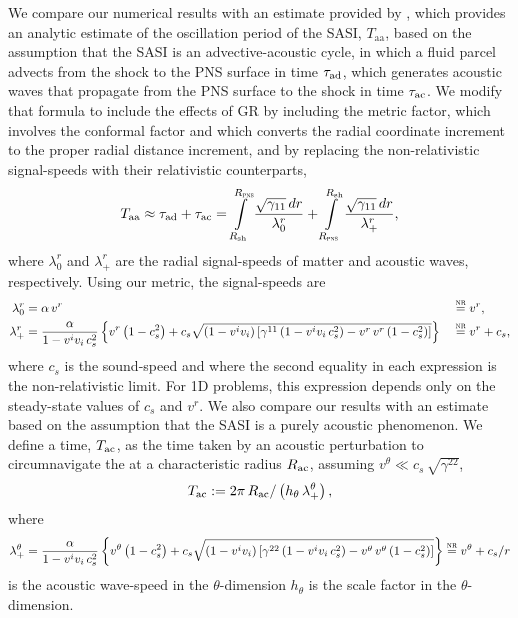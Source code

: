 We compare our numerical results with an estimate provided by
\citet{m2020}, which
provides an analytic estimate of the oscillation period
of the SASI, $T_{\mathrm{aa}}$,
based on the assumption that the SASI is an advective-acoustic cycle,
in which a fluid parcel advects from the shock to the PNS surface in time
$\tau_{\mathrm{ad}}$, which generates acoustic waves that propagate from the
PNS surface to the shock in time $\tau_{\mathrm{ac}}$.
We modify that formula to include the effects of GR
by including the metric factor, which involves the conformal factor
and which converts the radial coordinate increment to the proper radial
distance increment,
and by replacing the non-relativistic signal-speeds with their relativistic
counterparts,
\begin{equation}
  T_{\mathrm{aa}}\approx\tau_{\mathrm{ad}}+\tau_{\mathrm{ac}}
  =\int\limits_{R_{\mathrm{sh}}}^{R_{\textsc{pns}}}\frac{\sqrt{\gamma_{11}}\,dr}{\lambda^{r}_{0}}
  +\int\limits_{R_{\textsc{pns}}}^{R_{\mathrm{sh}}}\frac{\sqrt{\gamma_{11}}\,dr}{\lambda^{r}_{+}},
  \label{eq.MullerEst}
\end{equation}
where $\lambda^{r}_{0}$ and $\lambda^{r}_{+}$ are the radial signal-speeds of
matter and acoustic waves, respectively.
Using our metric, the signal-speeds are \citep{rz2013}
\begin{alignat}{2}
  \lambda^{r}_{0}&=\alpha\,v^{r}&&\stackrel{\textsc{nr}}{=}v^{r},\label{eq.lambda0}\\
  \lambda^{r}_{+}&=\frac{\alpha}{1-v^{i}v_{i}\,c_{s}^{2}}
  \left\{v^{r}\left(1-c_{s}^{2}\right)
  +c_{s}\sqrt{\left(1-v^{i}v_{i}\right)
  \left[\gamma^{11}\left(1-v^{i}v_{i}\,c_{s}^{2}\right)
  -v^{r}\,v^{r}\left(1-c_{s}^{2}\right)\right]}\right\}
  &&\stackrel{\textsc{nr}}{=}v^{r}+c_{s},\label{eq.lambda+}
\end{alignat}
where $c_{s}$ is the sound-speed
and where the second equality in each expression is the non-relativistic limit.
For 1D problems,
this expression depends only on the steady-state values of $c_{s}$ and $v^{r}$.
We also compare our results with an estimate based on the assumption that
the SASI is a purely acoustic phenomenon.
We define a time, $T_{\mathrm{ac}}$, as the time taken by an
acoustic perturbation
to circumnavigate the 
at a characteristic radius $R_{\mathrm{ac}}$,
assuming $v^{\theta}\ll c_{s}\,\sqrt{\gamma^{22}}$,
\begin{equation}
  T_{\mathrm{ac}}
  :=2\pi\,R_{\mathrm{ac}}/\left(h_{\theta}\,\lambda_{+}^{\theta}\right),
  \label{eq.Tac}
\end{equation}
where
\begin{equation}
  \lambda^{\theta}_{+}=\frac{\alpha}{1-v^{i}v_{i}\,c_{s}^{2}}
  \left\{v^{\theta}\left(1-c_{s}^{2}\right)
  +c_{s}\sqrt{\left(1-v^{i}v_{i}\right)
  \left[\gamma^{22}\left(1-v^{i}v_{i}\,c_{s}^{2}\right)
  -v^{\theta}\,v^{\theta}\left(1-c_{s}^{2}\right)\right]}\right\}
  \stackrel{\textsc{nr}}{=}v^{\theta}+c_{s}/r
\end{equation}
is the acoustic wave-speed in the $\theta$-dimension \citep{rz2013}
$h_{\theta}$ is the scale factor in the $\theta$-dimension.

